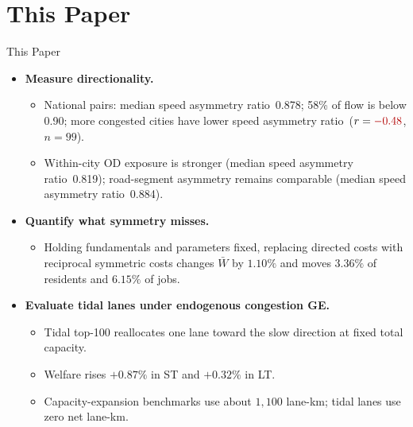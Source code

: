 \documentclass[11pt,aspectratio=169]{beamer}
\newcommand{\good}[1]{\textcolor{blue!70!black}{#1}}
\newcommand{\bad}[1]{\textcolor{red!70!black}{#1}}
\newcommand{\SAR}{speed asymmetry ratio}
\begin{document}
\section{This Paper}
\begin{frame}{This Paper}
\small
\begin{itemize}
  \item \textbf{Measure directionality.}
  \begin{itemize}\footnotesize
    \item National pairs: median \SAR\ \good{0.878}; \good{58\%} of flow is below 0.90; more congested cities have lower \SAR\ ($r=\bad{-0.48}$, $n=99$).
    \item Within-city OD exposure is stronger (median \SAR\ \good{0.819}); road-segment asymmetry remains comparable (median \SAR\ \good{0.884}).
  \end{itemize}
  \item \textbf{Quantify what symmetry misses.}
  \begin{itemize}\footnotesize
    \item Holding fundamentals and parameters fixed, replacing directed costs with reciprocal symmetric costs changes $\bar W$ by \good{$1.10\%$} and moves \good{$3.36\%$} of residents and \good{$6.15\%$} of jobs.
  \end{itemize}
  \item \textbf{Evaluate tidal lanes under endogenous congestion GE.}
  \begin{itemize}\footnotesize
    \item Tidal top-100 reallocates one lane toward the slow direction at fixed total capacity.
    \item Welfare rises \good{$+0.87\%$} in ST and \good{$+0.32\%$} in LT.
    \item Capacity-expansion benchmarks use about \good{$1{,}100$ lane-km}; tidal lanes use \good{zero net lane-km}.
  \end{itemize}
\end{itemize}
\end{frame}

\end{document}
